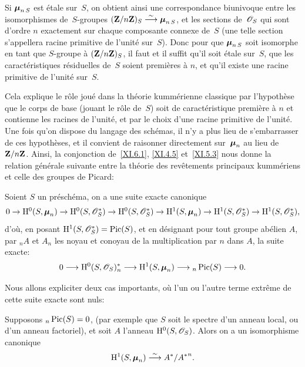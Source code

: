 \begin{corollaire}
\label{XI.6.3} Si $\boldsymbol{\mu}_{n\,S}$ est \'etale sur~$S$, on
obtient ainsi une correspondance biunivoque entre les isomorphismes de~$S$-groupes $(\mathbf{Z}/n\mathbf{Z})_S\overset{\sim}{\longrightarrow}\boldsymbol{\mu}_{n\,S}$, et les sections de~$\cal{O}_S$ qui sont d'ordre $n$ exactement sur chaque composante
connexe de~$S$ (une telle section s'appellera \og racine primitive
\nieme de l'unit\'e sur~$S$\fg). Donc pour que
$\boldsymbol{\mu}_{n\,S}$ soit isomorphe en tant que $S$-groupe \`a
$(\mathbf{Z}/n\mathbf{Z})_S$, il faut et il suffit qu'il soit \'etale
sur~$S$,
\ie que les caract\'eristiques r\'esiduelles de~$S$ soient
premi\`eres \`a $n$, et qu'il existe une racine primitive
\nieme de l'unit\'e sur~$S$.
\end{corollaire}

Cela explique le r\^ole jou\'e dans la th\'eorie kumm\'erienne
classique par l'hypoth\`ese que le corps de base (jouant le r\^ole
de~$S$) soit de caract\'eristique premi\`ere \`a $n$ et
contienne les racines \niemes de l'unit\'e, et par le choix
d'une racine primitive \nieme de l'unit\'e. Une fois qu'on
dispose du langage des sch\'emas, il n'y a plus lieu de s'embarrasser
de ces hypoth\`eses, et il convient de raisonner directement sur~$\boldsymbol{\mu}_n$ au lieu de~$\mathbf{Z}/n\mathbf{Z}$. Ainsi, la conjonction
de~\ref{XI.6.1}, \ref{XI.4.5} et~\ref{XI.5.3} nous donne la relation
g\'en\'erale suivante entre la th\'eorie des rev\^etements
principaux kumm\'eriens et celle des groupes de Picard:

\begin{proposition}
\label{XI.6.4}
Soient
$S$ un pr\'esch\'ema, on a une suite exacte canonique
$$
\textstyle
0\to\H^0(S,\bbmu_n)\to\H^0(S,\cal{O}^*_S)\to
\H^0(S,\cal{O}^*_S)\to\H^1(S,\bbmu_n)\to
\H^1(S,\cal{O}^*_S)\to\H^1(S,\cal{O}^*_S),
$$
d'o\`u, en posant
$\H^1(S,\cal{O}_S^*)=\Pic(S)$,
et en d\'esignant pour tout groupe ab\'elien $A$, par ${_n}A$ et
$A_n$ les noyau et conoyau de la multiplication par $n$ dans $A$, la
suite exacte:
$$
0\to\H^0(S,\cal{O}_S)^*_n\to\H^1(S,\bbmu_n)\to
{{}_n\Pic}(S)\to 0.
$$
\end{proposition}

Nous allons expliciter deux cas importants, o\`u l'un ou l'autre
terme extr\^eme de cette suite exacte sont nuls:

\begin{corollaire}
\label{XI.6.5} Supposons ${}_n\operatorname{Pic}(S)=0$, (par exemple
que $S$ soit le spectre d'un anneau local, ou d'un anneau factoriel),
et soit $A$ l'anneau $\H^0(S,\cal{O}_S)$. Alors on a un isomorphisme
canonique
$$
\mathrm{H}^1(S,\boldsymbol{\mu}_n)\overset{\sim}{\longrightarrow} A^*/{A^*}^n.
$$
\end{corollaire}

